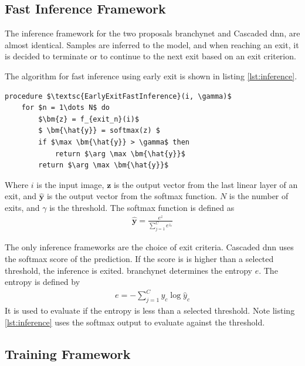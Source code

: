 \subsection{Fast Inference Framework} 

The inference framework for the two proposals \gls{branchynet} and Cascaded \gls{dnn}, are almost identical. Samples are inferred to the model, and when reaching an exit, it is decided to terminate or to continue to the next exit based on an exit criterion. 

The algorithm for fast inference using early exit is shown in listing \ref{lst:inference}. 

\begin{minipage}{\linewidth}
	\begin{lstlisting}[language = {}, mathescape=true, caption={Early Exit Fast Inference }, label={lst:inference}]
procedure $\textsc{EarlyExitFastInference}(i, \gamma)$
	for $n = 1\dots N$ do
		$\bm{z} = f_{exit_n}(i)$
		$ \bm{\hat{y}} = softmax(z) $
		if $\max \bm{\hat{y}} > \gamma$ then
			return $\arg \max \bm{\hat{y}}$
		return $\arg \max \bm{\hat{y}}$ 
	\end{lstlisting}
\end{minipage}

Where $ i $ is the input image, $ \bm{z} $ is the output vector from the last linear layer of an exit, and $ \bm{\hat{y}} $ is the output vector from the softmax function. $ N $ is the number of exits, and $ \gamma $ is the threshold. The softmax function is defined as
\begin{align}
\bm{\hat{y}} = \frac{e^{z}}{\sum_{j=1}^{C}e^{z_c}}
\end{align}

The only inference frameworks are the choice of exit criteria. Cascaded \gls{dnn} uses the softmax score of the prediction. If the score is is higher than a selected threshold, the inference is exited. \gls{branchynet} determines the entropy $ e $. The entropy is defined by
\begin{align}
e = -\sum_{j=1}^{C} y_c \log \hat{y}_c
\end{align}
It is used to evaluate if the entropy is less than a selected threshold. Note listing \ref{lst:inference} uses the softmax output to evaluate against the threshold.

\subsection{Training Framework} 


